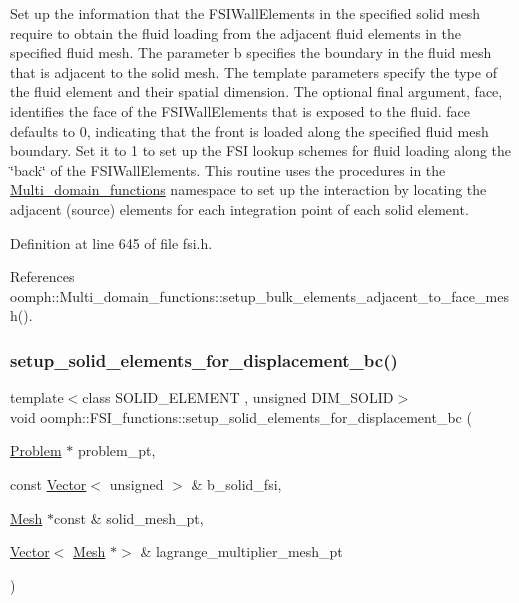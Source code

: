 Set up the information that the F\+S\+I\+Wall\+Elements in the specified solid mesh require to obtain the fluid loading from the adjacent fluid elements in the specified fluid mesh. The parameter b specifies the boundary in the fluid mesh that is adjacent to the solid mesh. The template parameters specify the type of the fluid element and their spatial dimension. The optional final argument, face, identifies the face of the F\+S\+I\+Wall\+Elements that is exposed to the fluid. face defaults to 0, indicating that the front is loaded along the specified fluid mesh boundary. Set it to 1 to set up the F\+SI lookup schemes for fluid loading along the \char`\"{}back\char`\"{} of the F\+S\+I\+Wall\+Elements. This routine uses the procedures in the \hyperlink{namespaceoomph_1_1Multi__domain__functions}{Multi\+\_\+domain\+\_\+functions} namespace to set up the interaction by locating the adjacent (source) elements for each integration point of each solid element. 



Definition at line 645 of file fsi.\+h.



References oomph\+::\+Multi\+\_\+domain\+\_\+functions\+::setup\+\_\+bulk\+\_\+elements\+\_\+adjacent\+\_\+to\+\_\+face\+\_\+mesh().

\mbox{\label{namespaceoomph_1_1FSI__functions_a9173ad6ec03d3542225ef8575e2bc66c}} 
\subsubsection{\texorpdfstring{setup\+\_\+solid\+\_\+elements\+\_\+for\+\_\+displacement\+\_\+bc()}{setup\_solid\_elements\_for\_displacement\_bc()}\hspace{0.1cm}{\footnotesize\ttfamily [1/2]}}
{\footnotesize\ttfamily template$<$class S\+O\+L\+I\+D\+\_\+\+E\+L\+E\+M\+E\+NT , unsigned D\+I\+M\+\_\+\+S\+O\+L\+ID$>$ \\
void oomph\+::\+F\+S\+I\+\_\+functions\+::setup\+\_\+solid\+\_\+elements\+\_\+for\+\_\+displacement\+\_\+bc (\begin{DoxyParamCaption}\item[{\hyperlink{classoomph_1_1Problem}{Problem} $\ast$}]{problem\+\_\+pt,  }\item[{const \hyperlink{classoomph_1_1Vector}{Vector}$<$ unsigned $>$ \&}]{b\+\_\+solid\+\_\+fsi,  }\item[{\hyperlink{classoomph_1_1Mesh}{Mesh} $\ast$const \&}]{solid\+\_\+mesh\+\_\+pt,  }\item[{\hyperlink{classoomph_1_1Vector}{Vector}$<$ \hyperlink{classoomph_1_1Mesh}{Mesh} $\ast$$>$ \&}]{lagrange\+\_\+multiplier\+\_\+mesh\+\_\+pt }\end{DoxyParamCaption})}



